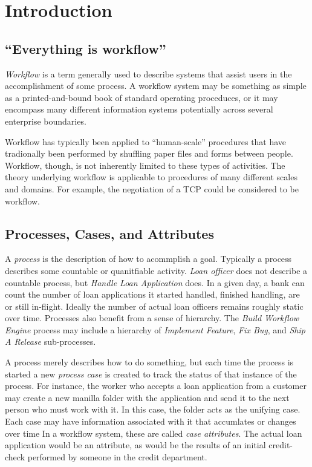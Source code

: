 
\chapter{Introduction}

\section{``Everything is workflow''}

\emph{Workflow} is a term generally used to describe systems that
assist users in the accomplishment of some process.  A workflow 
system may be something as simple as a printed-and-bound book
of standard operating proceduces, or it may encompass many
different information systems potentially across several
enterprise boundaries.

Workflow has typically been applied to ``human-scale'' procedures
that have tradionally been performed by shuffling paper files 
and forms between people.  Workflow, though, is not inherently
limited to these types of activities.  The theory underlying
workflow is applicable to procedures of many different scales
and domains.  For example, the negotiation of a TCP could be
considered to be workflow.

\section{Processes, Cases, and Attributes}

A \emph{process} is the description of how to acommplish a goal.
Typically a process describes some countable or quanitfiable
activity.  \emph{Loan officer} does not describe a countable
process, but \emph{Handle Loan Application} does.  In a given
day, a bank can count the number of loan applications it
started handled, finished handling, are or still in-flight.
Ideally the number of actual loan officers remains roughly
static over time.  Processes also benefit from a sense
of hierarchy.  The \emph{Build Workflow Engine} process may
include a hierarchy of \emph{Implement Feature}, \emph{Fix Bug},
and \emph{Ship A Release} sub-processes.

A process merely describes how to do something, but each
time the process is started a new \emph{process case} is
created to track the status of that instance of the 
process.  For instance, the worker who accepts a loan
application from a customer may create a new manilla
folder with the application and send it to the next
person who must work with it.  In this case, the folder
acts as the unifying case.  Each case may have information
associated with it that accumlates or changes over time
In a workflow system, these are called \emph{case attributes}.
The actual loan application would be an attribute, as
would be the results of an initial credit-check performed
by someone in the credit department.


